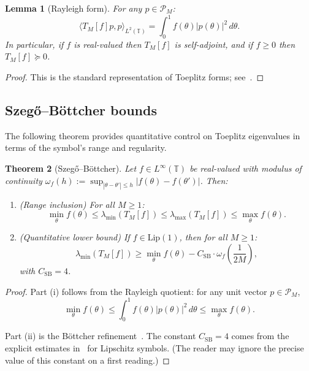 \documentclass[11pt,a4paper]{article}
\newtheorem{theorem}{Theorem}[section]
\newtheorem{lemma}[theorem]{Lemma}
\theoremstyle{definition}
\theoremstyle{remark}
\newcommand{\T}{\mathbb{T}}
\begin{document}
\begin{lemma}[Rayleigh form]\label{lem:rayleigh}
For any $p \in \mathcal{P}_M$:
\[
  \langle T_M[f] p, p \rangle_{L^2(\T)} = \int_0^1 f(\theta) |p(\theta)|^2\, d\theta.
\]
In particular, if $f$ is real-valued then $T_M[f]$ is self-adjoint, and if $f \geq 0$ then $T_M[f] \succeq 0$.
\end{lemma}

\begin{proof}
This is the standard representation of Toeplitz forms; see~\cite[Chapter~1]{GrenanderSzego1958}.
\end{proof}

\subsection{Szeg\H{o}--B\"ottcher bounds}

The following theorem provides quantitative control on Toeplitz eigenvalues in terms of the symbol's range and regularity.

\begin{theorem}[Szeg\H{o}--B\"ottcher]\label{thm:SB}
Let $f \in L^\infty(\T)$ be real-valued with modulus of continuity $\omega_f(h) := \sup_{|\theta - \theta'| \leq h} |f(\theta) - f(\theta')|$. Then:
\begin{enumerate}[label=(\roman*)]
\item (Range inclusion) For all $M \geq 1$:
\[
  \min_\theta f(\theta) \leq \lambda_{\min}(T_M[f]) \leq \lambda_{\max}(T_M[f]) \leq \max_\theta f(\theta).
\]
\item (Quantitative lower bound) If $f \in \mathrm{Lip}(1)$, then for all $M \geq 1$:
\begin{equation}\label{eq:SB-bound}
  \lambda_{\min}(T_M[f]) \geq \min_\theta f(\theta) - C_{\mathrm{SB}} \cdot \omega_f\left(\frac{1}{2M}\right),
\end{equation}
with $C_{\mathrm{SB}} = 4$.
\end{enumerate}
\end{theorem}

\begin{proof}
Part (i) follows from the Rayleigh quotient: for any unit vector $p \in \mathcal{P}_M$,
\[
  \min_\theta f(\theta) \leq \int_0^1 f(\theta) |p(\theta)|^2\, d\theta \leq \max_\theta f(\theta).
\]

Part (ii) is the B\"ottcher refinement~\cite{BoettcherSilbermann2006}. The constant $C_{\mathrm{SB}} = 4$ comes from the explicit estimates in~\cite[Theorem~5.11]{BoettcherSilbermann2006} for Lipschitz symbols. (The reader may ignore the precise value of this constant on a first reading.)
\end{proof}
\end{document}
